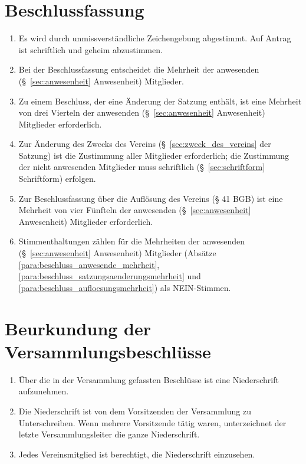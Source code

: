 \documentclass[a4paper]{article}
\begin{document}
\section{Beschlussfassung}\label{sec:beschlussfassung}

\begin{enumerate}
\item Es wird durch unmissverständliche Zeichengebung abgestimmt. Auf Antrag ist schriftlich und geheim abzustimmen.\label{para:beschluss_zeichen}
\item Bei der Beschlussfassung entscheidet die Mehrheit der anwesenden (§~\ref{sec:anwesenheit} Anwesenheit) Mitglieder.\label{para:beschluss_anwesende_mehrheit}
\item Zu einem Beschluss, der eine Änderung der Satzung enthält, ist eine Mehrheit von drei Vierteln der anwesenden (§~\ref{sec:anwesenheit} Anwesenheit) Mitglieder erforderlich.\label{para:beschluss_satzungsaenderungsmehrheit}
\item Zur Änderung des Zwecks des Vereins (§~\ref{sec:zweck_des_vereins} der Satzung) ist die Zustimmung aller Mitglieder erforderlich; die Zustimmung der nicht anwesenden Mitglieder muss schriftlich (§~\ref{sec:schriftform} Schriftform) erfolgen.\label{para:beschluss_zweckaenderungsmehrheit}
\item Zur Beschlussfassung über die Auflösung des Vereins (§ 41 BGB) ist eine Mehrheit von vier Fünfteln der anwesenden (§~\ref{sec:anwesenheit} Anwesenheit) Mitglieder erforderlich.\label{para:beschluss_aufloesungsmehrheit}
\item Stimmenthaltungen zählen für die Mehrheiten der anwesenden (§~\ref{sec:anwesenheit} Anwesenheit) Mitglieder (Absätze \ref{para:beschluss_anwesende_mehrheit}, \ref{para:beschluss_satzungsaenderungsmehrheit} und \ref{para:beschluss_aufloesungsmehrheit}) als NEIN-Stimmen.
\end{enumerate}


\section{Beurkundung der Versammlungsbeschlüsse}\label{sec:beurkundung_der_versammlungsbeschluesse}

\begin{enumerate}
\item Über die in der Versammlung gefassten Beschlüsse ist eine Niederschrift aufzunehmen.
\item Die Niederschrift ist von dem Vorsitzenden der Versammlung zu Unterschreiben. Wenn mehrere Vorsitzende tätig waren, unterzeichnet der letzte Versammlungsleiter die ganze Niederschrift.
\item Jedes Vereinsmitglied ist berechtigt, die Niederschrift einzusehen.

\end{enumerate}
\end{document}
